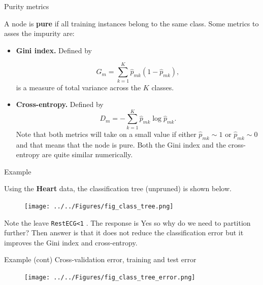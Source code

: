 \documentclass{beamer}
\begin{document}
\begin{frame}{Purity metrics}
	
	A node is {\bf pure} if all training instances belong to the same class. 
	Some metrics to asses the impurity are:
	\begin{itemize}
		\item {\bf Gini index.} Defined by
		
		\begin{equation*}
			G_m= \sum_{k=1}^K \hat{p}_{mk} (1 - \hat{p}_{mk}),
		\end{equation*}
		is a measure of total variance across the $K$ classes. 
	\item {\bf Cross-entropy. } Defined by
	\begin{equation*}
		D_m = - \sum_{k=1}^K \hat{p}_{mk}\log \hat{p}_{mk}.
	\end{equation*}	
	Note that both metrics will take on a small value if either $\hat{p}_{mk} \sim 1$ or $\hat{p}_{mk} \sim 0$ and that means that the node is pure. Both the Gini index and the cross-entropy are quite similar numerically. 
\end{itemize}
	
\end{frame}

\begin{frame}{Example}
	
	Using the {\bf Heart} data, the classification tree (unpruned) is shown below. 
	\begin{figure}[h]
	\centering
	\texttt{[image: ../../Figures/fig\_class\_tree.png]}
\end{figure}	
Note the leave {\tt RestECG<1} . The response is Yes so why do we need to partition further? Then answer is that it does not reduce the classification error but  it improves the Gini index and cross-entropy. 
\end{frame}
	
\begin{frame}{Example (cont)}
	Cross-validation error, training and test error 
	
		\begin{figure}[h]
		\centering
		\texttt{[image: ../../Figures/fig\_class\_tree\_error.png]}
	\end{figure}
	
\end{frame}
\end{document}
